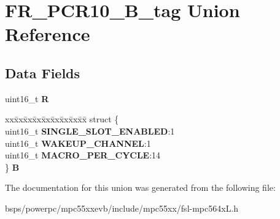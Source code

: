 \hypertarget{unionFR__PCR10__16B__tag}{}\section{F\+R\+\_\+\+P\+C\+R10\+\_\+B\+\_\+tag Union Reference}
\label{unionFR__PCR10__16B__tag}
\subsection*{Data Fields}
\begin{DoxyCompactItemize}
\item 
\mbox{\label{unionFR__PCR10__16B__tag_a98979a67138bf3a680fdc19cd9e6c2ca}} 
uint16\+\_\+t {\bfseries R}
\item 
\mbox{\label{unionFR__PCR10__16B__tag_ac732caa3c9ff2a527f3c73415c9ba5e3}} 
\begin{tabbing}
xx\=xx\=xx\=xx\=xx\=xx\=xx\=xx\=xx\=\kill
struct \{\\
\>uint16\_t {\bfseries SINGLE\_SLOT\_ENABLED}:1\\
\>uint16\_t {\bfseries WAKEUP\_CHANNEL}:1\\
\>uint16\_t {\bfseries MACRO\_PER\_CYCLE}:14\\
\} {\bfseries B}\\

\end{tabbing}\end{DoxyCompactItemize}


The documentation for this union was generated from the following file\+:\begin{DoxyCompactItemize}
\item 
bsps/powerpc/mpc55xxevb/include/mpc55xx/fsl-\/mpc564x\+L.\+h\end{DoxyCompactItemize}
